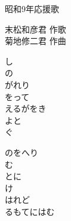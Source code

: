 \documentclass[10pt,b5j]{tarticle} %
\begin{document}
\begin{minipage}[c]{0.7\hsize} %
    \begin{center}
        {\LARGE
            昭和9年応援歌 %
        }
        {\small 
        }
    \end{center}
\end{minipage}
\begin{minipage}[c]{0.3\hsize} %
    \begin{flushright} %
        末松和彦君 作歌\\菊地修二君 作曲 %
    \end{flushright}
\end{minipage}

\vspace{1.5em} %
\newcommand{\linespace}{0.5em} %
\newcommand{\blocksize}{0.5\hsize} %
\begin{enumerate} %
    \begin{minipage}[c]{\blocksize}
    
        \vspace{\linespace}
        \item
        し\\
        の\\
        がれり\\
        をって\\
        えるがをき\\
        よと\\
        ぐ
        
        \vspace{\linespace}
        \item
        のをへり\\
        む\\
        とに\\
        け\\
        はれど\\
        るもてにはむ
    
    \end{minipage}
\end{enumerate} %
\end{document}

